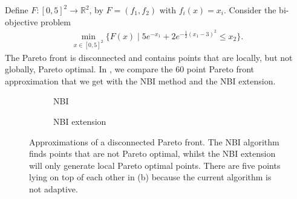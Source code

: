 \documentclass[main.tex]{subfiles}
\begin{document}
\begin{example}\label{ex:pareto_disconnected}
  Define
  $F:{[0,5]}^2\to\mathbb{R}^2$, by $F=(f_1,f_2)$ with $f_i(x)=x_i$.
  Consider the bi-objective problem
  \begin{align}
    \min_{x\in{[0,5]}^2}\{F(x)\mid
    5e^{-x_1}+2e^{-\frac{1}{2}{(x_1-3)}^2} \leq x_2\}.
  \end{align}
  The Pareto front is disconnected and contains points that are
  locally, but not globally, Pareto optimal.
  In , we compare the 60 point Pareto
  front approximation that we get with
  the NBI method and the NBI extension.
  \begin{figure}[htbp]
    \centering
    \begin{subfigure}[t]{.5\textwidth}
      \caption{NBI}
    \end{subfigure}%
    \begin{subfigure}[t]{.5\textwidth}
      \caption{NBI extension}
    \end{subfigure}
    \caption{Approximations of a disconnected Pareto front. The NBI
      algorithm finds points that are not Pareto optimal, whilst the
      NBI extension will only generate local Pareto
      optimal points. There are five points lying on top of each other
      in (b) because the current algorithm is not adaptive.
    }\label{fig:pareto_disconnected}
  \end{figure}
\end{example}
\end{document}
